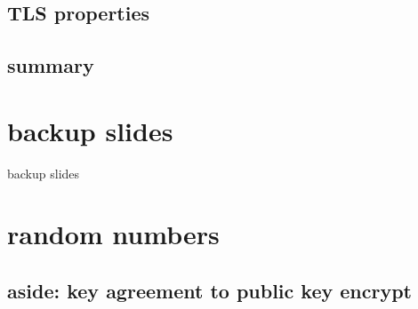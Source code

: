 \subsection{TLS properties}

\subsection{summary}




\usetikzlibrary{circuits.logic.mux}







\section{backup slides}
\begin{frame}{backup slides}
\end{frame}
\section{random numbers}

\subsection{aside: key agreement to public key encrypt}




